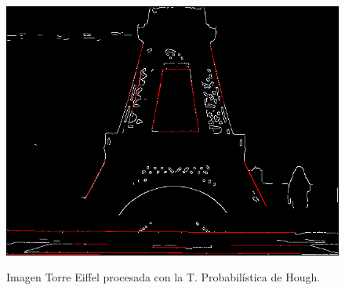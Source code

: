 \begin{figure}[ht!]
\begin{center}
\includegraphics[height=0.4\textwidth]{fig/eiffel_phough}\\
\caption{Imagen Torre Eiffel procesada con la T. Probabilística de Hough.}
\label{fig_eiffel_phough}
\end{center}
\end{figure}
